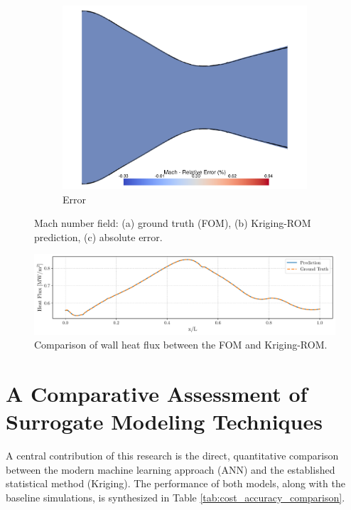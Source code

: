 \documentclass[tg, EN]{ufabcFHZh_tg}
\begin{document}
\begin{figure}[H]
\begin{subfigure}[b]{0.32\textwidth}
        \includegraphics[width=\textwidth]{Figuras/kriging_error_mach.pdf}
        \caption{Error}
    \end{subfigure}
    \caption{Mach number field: (a) ground truth (FOM), (b) Kriging-ROM prediction, (c) absolute error.}
    \label{fig:kriging_reconstruction_mach}
\end{figure}

\begin{figure}[H]
    \centering
    \includegraphics[width=\textwidth]{Figuras/kriging_heat_flux.pdf}
    \caption{Comparison of wall heat flux between the FOM and Kriging-ROM.}
    \label{fig:kriging_reconstruction_heat_flux}
\end{figure}

\section{A Comparative Assessment of Surrogate Modeling Techniques}

A central contribution of this research is the direct, quantitative comparison between the modern machine learning approach (ANN) and the established statistical method (Kriging). The performance of both models, along with the baseline simulations, is synthesized in Table \ref{tab:cost_accuracy_comparison}.
\end{document}
